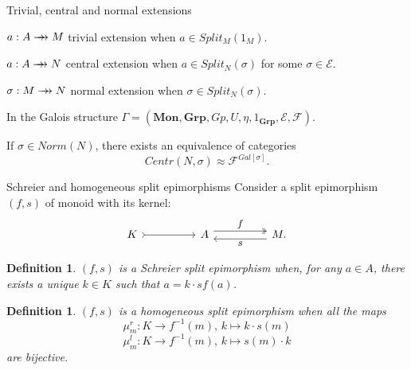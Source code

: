 \documentclass[4pt]{beamer}
\newtheorem{defi}[teo]{Definition}
\newcommand{\rrightarrow}{\mathrel{\mathrlap{\rightarrow}\mkern1mu\rightarrow}}
\begin{document}
\begin{frame}{Trivial, central and normal extensions}

    $a:A\rrightarrow M$ trivial extension when $a\in Split_M(1_M)$.

    \vspace{3mm}
    
    $a:A\rrightarrow N$ central extension when $a\in Split_N(\sigma)$ for some $\sigma\in\mathscr{E}$.

    \vspace{3mm}
    
    $\sigma:M\rrightarrow N$ normal extension when $\sigma\in Split_N(\sigma)$.

    \vspace{5mm}

    In the Galois structure $\Gamma = (\textbf{Mon}, \textbf{Grp}, Gp, U, \eta, 1_{\textbf{Grp}}, \mathscr{E}, \mathscr{F})$.
    
    If $\sigma\in Norm(N)$, there exists an equivalence of categories
    \[ Centr(N,\sigma) \approx \mathscr{F}^{Gal[\sigma]}. \]
\end{frame}

\begin{frame}{Schreier and homogeneous split epimorphisms}
    Consider a split epimorphism $(f,s)$ of monoid with its kernel:
    \[\begin{tikzcd}[every label/.append style = {font = \small}, ampersand replacement=\&]
        K \arrow[rr, tail] \& \& A \arrow[rr, "f", two heads, shift left=1.5] \& \& M. \arrow[ll, "s", shift left=1.5]
    \end{tikzcd}\]
    \begin{defi}
        $(f,s)$ is a Schreier split epimorphism when, for any $a\in A$, there exists a unique $k\in K$ such that $a=k\cdot sf(a)$.
    \end{defi}
    \begin{defi}
        $(f,s)$ is a homogeneous split epimorphism when all the maps
        \[ \mu^r_m:K\longrightarrow f^{-1}(m)\text{, } k \longmapsto k\cdot s(m) \]
        \[ \mu^l_m:K\longrightarrow f^{-1}(m)\text{, }k \longmapsto s(m)\cdot k \]
        are bijective.
    \end{defi}
\end{frame}
\end{document}
